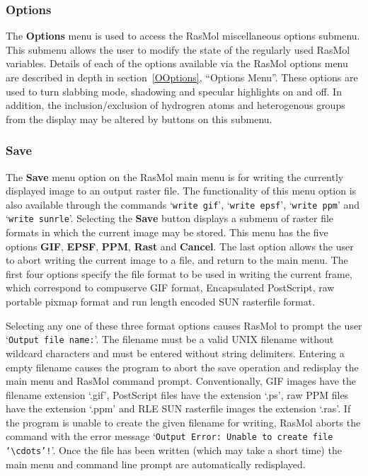 \subsubsection{Options}
\label{MOptions}
The {\bf Options} menu is used to access the RasMol miscellaneous options
submenu. This submenu allows the user to modify the state of the regularly
used RasMol variables. Details of each of the options available via the
RasMol options menu are described in depth in section~\ref{OOptions}, 
``Options Menu''. These options are used to turn slabbing mode, shadowing
and specular highlights on and off. In addition, the inclusion/exclusion of
hydrogren atoms and heterogenous groups from the display may be altered by
buttons on this submenu.

\subsubsection{Save}
\label{MSave}
The {\bf Save} menu option on the RasMol main menu is for writing the
currently displayed image to an output raster file. The functionality of
this menu option is also available through the commands `{\tt write~gif}',
`{\tt write epsf}', `{\tt write~ppm}' and `{\tt write~sunrle}'. Selecting 
the {\bf Save} button displays a submenu of raster file formats in which
the current image may be stored. This menu has the five options {\bf GIF},
{\bf EPSF}, {\bf PPM}, {\bf Rast} and {\bf Cancel}. The last option allows
the user to abort writing the current image to a file, and return to the 
main menu. The first four options specify the file format to be used in 
writing the current frame, which correspond to compuserve GIF format, 
Encapsulated PostScript, raw portable pixmap format and run length encoded 
SUN rasterfile format. 

Selecting any one of these three format options causes RasMol to prompt 
the user `{\tt Output file name:}'. The filename must be a valid UNIX 
filename without wildcard characters and must be entered without string
delimiters. Entering a empty filename causes the program to abort the save
operation and redisplay the main menu and RasMol command prompt. 
Conventionally, GIF images have the filename extension `.gif', PostScript
files have the extension `.ps', raw PPM files have the extension `.ppm' 
and RLE SUN rasterfile images the extension `.ras'. If the program is unable 
to create the given filename for writing, RasMol aborts the command with 
the error message `{\tt Output Error: Unable to create file `$\cdots$'!}'. 
Once the file has been written (which may take a short time) the main menu 
and command line prompt are automatically redisplayed.
\nocite{Adobe85a,Adobe85b}


